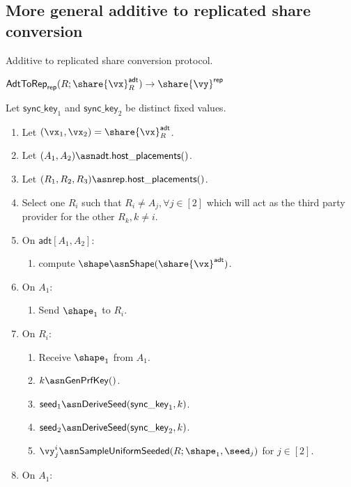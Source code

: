 \subsection{More general additive to replicated share conversion}


Additive to replicated share conversion
protocol.


\msubsubsection
{$\mathsf{AdtToRep}_\mathsf{rep}(R;\share{\vx}^{\mathsf{adt}}_{R}) \rightarrow \share{\vy}^\mathsf{rep}$}
\label{fig:general-two-to-three}

Let $\mathsf{sync\_key}_1$ and $\mathsf{sync\_key}_2$ be distinct fixed values.

\begin{enumerate}
\item Let $(\vx_1, \vx_2) = \share{\vx}^{\mathsf{adt}}_{R}$.
\item Let $(A_1, A_2) \asn \mathsf{adt}.\mathsf{host\_placements()}$.
\item Let $(R_1, R_2, R_3) \asn \mathsf{rep}.\mathsf{host\_placements()}$.
\item Select one $R_i$ such that $R_i \neq A_j, \forall j \in [2]$ which will act as the third party provider for the other $R_k, k \neq i$.
\item On $\mathsf{adt}[A_1, A_2]$:
\begin{enumerate}
    \item compute $\shape \asn \mathsf{Shape}(\share{\vx}^{\mathsf{adt}})$.
\end{enumerate}
\item On $A_1$:
\begin{enumerate}
    \item Send $\shape_1$ to $R_i$.
\end{enumerate}
\item On $R_i$:
\begin{enumerate}
    \item Receive $\shape_1$ from $A_1$.
    \item $k \asn \mathsf{GenPrfKey}()$.
    \item $\mathsf{seed}_1 \asn \mathsf{DeriveSeed}(\mathsf{sync\_key}_1, k)$.
    \item $\mathsf{seed}_2 \asn \mathsf{DeriveSeed}(\mathsf{sync\_key}_2, k)$.
    \item $\vy_j^i \asn \mathsf{SampleUniformSeeded}(R; \shape_1, \seed_j)$ for $j \in [2]$.
\end{enumerate}
\item On $A_1$:
\begin{enumerate}

\end{enumerate}
\end{enumerate}
